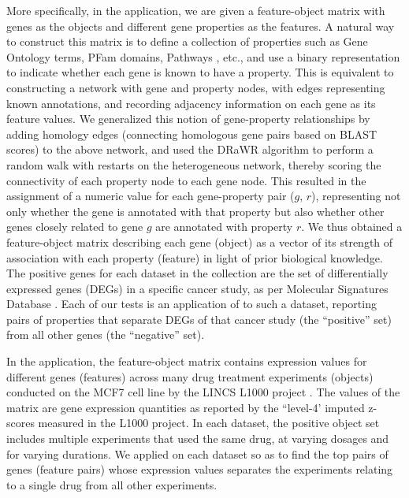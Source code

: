 More specifically, in the \msig application, we are given a feature-object matrix with genes as the objects and different gene properties as the features. A natural way to construct this matrix is to define a collection of properties such as Gene Ontology terms, PFam domains, Pathways , etc., and use a binary representation to indicate whether each gene is known to have a property. This is equivalent to constructing a network with gene and property nodes, with edges representing known annotations, and recording adjacency information on each gene as its feature values. We generalized this notion of gene-property relationships by adding homology edges (connecting homologous gene pairs based on BLAST scores) to the above network, and used the DRaWR algorithm  to perform a random walk with restarts on the heterogeneous network, thereby scoring the connectivity of each property node to each gene node. This resulted in the assignment of a numeric value for each gene-property pair ($g$, $r$), representing not only whether the gene is annotated with that property but also whether other genes closely related to gene $g$ are annotated with property $r$. We thus obtained a feature-object matrix describing each gene (object) as a vector of its strength of association with each property (feature) in light of prior biological knowledge.
 The positive genes for each dataset in the \msig collection are the set of differentially expressed genes (DEGs) in a specific cancer study, as per Molecular Signatures Database . Each of our tests is an application of \genviz to such a dataset, reporting pairs of properties that separate DEGs of that cancer study (the ``positive'' set) from all other genes (the ``negative'' set).

In the \lincs application, the feature-object matrix contains expression values for different genes (features) across many drug treatment experiments (objects) conducted on the MCF7 cell line by the LINCS L1000 project . The values of the matrix are gene expression quantities as reported by the ``level-4' imputed z-scores measured in the L1000 project. In each dataset, the positive object set includes multiple experiments that used the same drug, at varying dosages and for varying durations. We applied \genviz on each dataset so as to find the top pairs of genes (feature pairs) whose expression values separates the \lincs experiments relating to a single drug from all other \lincs experiments. 

